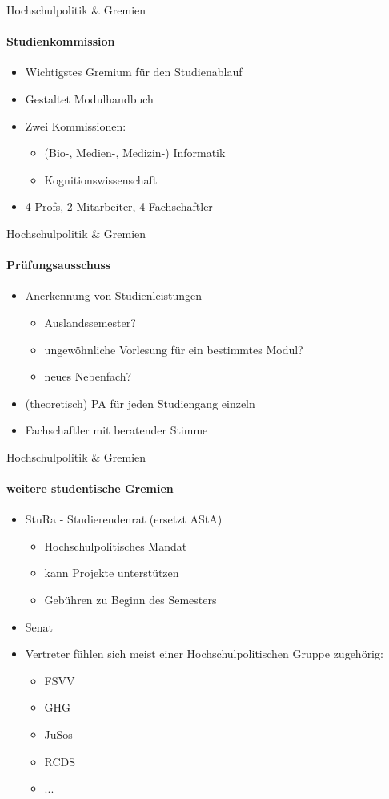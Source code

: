 \documentclass{beamer}
\begin{document}
	\begin{frame}{Hochschulpolitik \& Gremien}
		\framesubtitle{Studienkommission}
	 	\begin{itemize}
	 		\item Wichtigstes Gremium für den Studienablauf
	 		\item Gestaltet Modulhandbuch
	 		\item Zwei Kommissionen:
	 			\begin{itemize}
	 				\item (Bio-, Medien-, Medizin-) Informatik
	 				\item Kognitionswissenschaft
	 			\end{itemize}
	 		\item 4 Profs, 2 Mitarbeiter, 4 Fachschaftler\\
	 	\end{itemize}
	 \end{frame}
	
	\begin{frame}{Hochschulpolitik \& Gremien}
		\framesubtitle{Prüfungsausschuss}
	 	\begin{itemize}
	 		\item Anerkennung von Studienleistungen
	 			\begin{itemize}
	 				\item Auslandssemester?
	 				\item ungewöhnliche Vorlesung für ein bestimmtes Modul?
	 				\item neues Nebenfach?
	 			\end{itemize}
	 		\item (theoretisch) PA für jeden Studiengang einzeln
	 		\item Fachschaftler mit beratender Stimme
	 	\end{itemize}
	 \end{frame}
	
	\begin{frame}{Hochschulpolitik \& Gremien}
		\framesubtitle{weitere studentische Gremien}
	 	\begin{itemize}
	 		\item StuRa - Studierendenrat (ersetzt AStA)
	 			\begin{itemize}
	 				\item Hochschulpolitisches Mandat
	 				\item kann Projekte unterstützen
	 				\item Gebühren zu Beginn des Semesters
	 			\end{itemize}
	 		\item Senat
	 		\item Vertreter fühlen sich meist einer Hochschulpolitischen Gruppe zugehörig:
	 			\begin{itemize}
	 				\item FSVV
	 				\item GHG
	 				\item JuSos
	 				\item RCDS
	 				\item ...
	 			\end{itemize}
	 	\end{itemize}
	 \end{frame}
	
\end{document}
